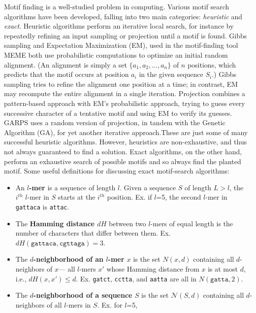 \documentclass{acm_proc_article-sp}
\begin{document}
	Motif finding is a well-studied problem in computing. Various motif search algorithms have been developed, falling into two main categories: \emph{heuristic} and \emph{exact}.
	Heuristic algorithms perform an iterative local search, for instance by repeatedly refining an input sampling or projection until a motif is found. Gibbs sampling \cite{lawrence1993detecting} and Expectation Maximization (EM), used in the motif-finding tool MEME \cite{lawrence1990expectation,bailey1995unsupervised} both use probabilistic computations to optimize an initial random alignment. (An alignment is simply a set $\{a_{1}, a_{2},...,a_{n}\}$ of $n$ positions, which predicts that the motif occurs at position $a_{i}$ in the given sequence $S_{i}$.) Gibbs sampling tries to refine the alignment one position at a time; in contrast, EM may recompute the entire alignment in a single iteration. Projection \cite{blanchette2002discovery} combines a pattern-based approach with EM's probabilistic approach,  trying to guess every successive character of a tentative motif and using EM to verify its guesses. GARPS \cite{huo2009combining} uses a random version of projection, in tandem with the Genetic Algorithm (GA), for yet another iterative approach.These are just some of many successful heuristic algorithms. However, heuristics are non-exhaustive, and thus not always guaranteed to find a solution. Exact algorithms, on the other hand, perform an exhaustive search of possible motifs and so always find the planted motif. Some useful definitions for discussing exact motif-search algorithms:
		\begin{itemize}
			\small
			\item An \textbf{\boldmath $l$-mer} is a sequence of length $l$.
			Given a sequence $S$ of length $L > l$, the $i^{th}$ $l$-mer in $S$ starts at the $i^{th}$ position.
			Ex. if $l$=5, the second $l$-mer in \texttt{gattaca} is \texttt{attac}.
	
			\item The \textbf{\boldmath Hamming distance $dH$} 
			between two $l$-mers of equal length is the number of characters that differ between them.
			Ex. $dH(\texttt{gattaca}, \texttt{cgttaga}) = 3$.
	
			\item The \textbf{\boldmath $d$-neighborhood of an $l$-mer $x$}
			is the set {\boldmath $N(x, d)$} containing all $d$-neighbors of $x$---
			all $l$-mers $x'$ whose Hamming distance from $x$ is at most $d$, i.e., {\boldmath $dH (x, x') \leq d$}.
			\newline Ex. \texttt{gatct}, \texttt{cctta}, and \texttt{aatta} are all in $N(\texttt{gatta}, 2)$.
	
			\item The \textbf{\boldmath $d$-neighborhood of a sequence $S$} %
			is the set {\boldmath $\mathcal{N}(S, d)$}
			\newline containing all $d$-neighbors of all $l$-mers in $S$. Ex. for $l$=5,
			
			\end{itemize}
\end{document}
